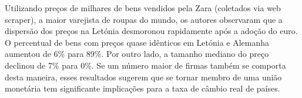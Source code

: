 \documentclass[twoside,a4paper,11pt]{report}
\begin{document}
Utilizando preços de milhares de bens vendidos pela Zara (coletados via web scraper), a maior varejista de roupas do mundo, os autores observaram que a dispersão dos preços na Letónia desmoronou rapidamente após a adoção do euro. O percentual de bens com preços quase idênticos em Letónia e Alemanha aumentou de 6\% para 89\%. Por outro lado, a tamanho mediano do preço declinou de 7\% para 0\%. Se um número maior de firmas também se comporta desta maneira, esses resultados sugerem que se tornar membro de uma união monetária tem significante implicações para a taxa de câmbio real de países. 


% 
% 
% 
% 
% 
% 
% 
\end{document}
